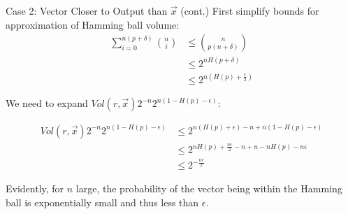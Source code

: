 \documentclass[aspectratio=169]{beamer}
\begin{document}
      \begin{frame}[shrink=20]{Case 2: Vector Closer to Output than $\vec{x}$ (cont.)}
        First simplify bounds for approximation of Hamming ball volume:
        \begin{align*}
          \sum_{i=0}^{n(p+\delta)} \binom{n}{i}
          &\le \binom{n}{p(n+\delta)} \\
          &\le 2^{nH(p+\delta)} \\
          &\le 2^{n(H(p)+\frac{\epsilon}{2})}
                    \end{align*}

                    We need to expand $Vol(r, \vec{x})2^{-n}2^{n(1-H(p)-\epsilon)}$:

                    \begin{align*}
                        Vol(r, \vec{x})2^{-n}2^{n(1-H(p)-\epsilon)} &\le 2^{n(H(p) + \epsilon) -n + n(1-H(p)-\epsilon) } \\
                        &\le2^{nH(p) + \frac{n\epsilon}{2} -n + n-nH(p)-n\epsilon } \\
                        &\le2^{-\frac{n\epsilon}{2}}
                      \end{align*}

                  Evidently, for $n$ large, the probability of the vector being within the Hamming ball is exponentially small and thus less than $\epsilon$.
        \end{frame}
\end{document}
